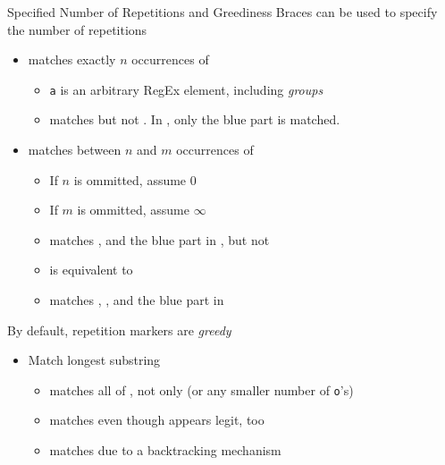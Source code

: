 \begin{frame}{Specified Number of Repetitions and Greediness}
%
Braces can be used to specify the number of repetitions
\begin{itemize}
\item {} matches exactly $n$ occurrences of 
	\begin{itemize}
	\item \texttt{a} is an arbitrary RegEx element, including \emph{groups}
	\item[\Thus]  matches  but not . In , only the blue part is matched.
	\end{itemize}
\pause
\item {} matches between $n$ and $m$ occurrences of 
	\begin{itemize}
	\item If $n$ is ommitted, assume $0$
	\item If $m$ is ommitted, assume $\infty$
	\item[\Thus]  matches 
		,
		and the blue part in 
		,
		but not 
	\item[\Thus]  is equivalent to 
	\item[\Thus]  matches 
		,
		,
		and the blue part in 
	\end{itemize}
\end{itemize}
\pause

By default, repetition markers are \emph{greedy}
\begin{itemize}
\item Match longest substring
	\begin{itemize}
	\item {} matches all of , not only  (or any smaller number of \texttt{o}'s)
	\item {} matches  even though  appears legit, too
	\item {} matches  due to a backtracking mechanism
	\end{itemize}
\end{itemize}
%
\end{frame}


